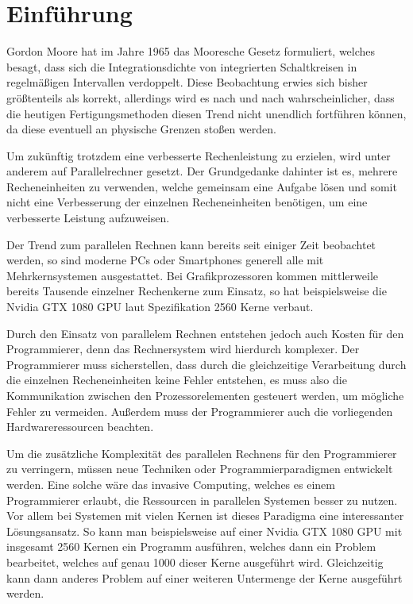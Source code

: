 \chapter{Einführung}\label{sec:intro}

Gordon Moore hat im Jahre 1965 das Mooresche Gesetz formuliert, welches besagt, dass sich die Integrationsdichte
von integrierten Schaltkreisen in regelmäßigen Intervallen verdoppelt\cite{mooresLawPastPresentFuture}.
Diese Beobachtung erwies sich bisher größtenteils als korrekt, allerdings wird es nach und nach wahrscheinlicher,
dass die heutigen Fertigungsmethoden diesen Trend nicht unendlich fortführen können, da diese eventuell an
physische Grenzen stoßen werden.

Um zukünftig trotzdem eine verbesserte Rechenleistung zu erzielen, wird unter anderem auf Parallelrechner gesetzt.
Der Grundgedanke dahinter ist es, mehrere Recheneinheiten zu verwenden, welche gemeinsam eine Aufgabe
lösen und somit nicht eine Verbesserung der einzelnen Recheneinheiten benötigen, um eine verbesserte Leistung
aufzuweisen.

Der Trend zum parallelen Rechnen kann bereits seit einiger Zeit beobachtet werden,
so sind moderne PCs oder Smartphones generell alle mit Mehrkernsystemen ausgestattet.
Bei Grafikprozessoren kommen mittlerweile bereits Tausende einzelner Rechenkerne zum Einsatz,
so hat beispielsweise die Nvidia GTX 1080 GPU laut Spezifikation \cite{nvidia1080specs} 2560 Kerne verbaut.

Durch den Einsatz von parallelem Rechnen entstehen jedoch auch Kosten für den Programmierer,
denn das Rechnersystem wird hierdurch komplexer.
Der Programmierer muss sicherstellen, dass durch die gleichzeitige Verarbeitung durch die einzelnen
Recheneinheiten keine Fehler entstehen, es muss also die Kommunikation zwischen den Prozessorelementen gesteuert 
werden, um mögliche Fehler zu vermeiden.
Außerdem muss der Programmierer auch die vorliegenden Hardwareressourcen beachten.

Um die zusätzliche Komplexität des parallelen Rechnens für den Programmierer zu verringern,
müssen neue Techniken oder Programmierparadigmen entwickelt werden.
Eine solche wäre das invasive Computing, welches es einem Programmierer erlaubt,
die Ressourcen in parallelen Systemen besser zu nutzen.
Vor allem bei Systemen mit vielen Kernen ist dieses Paradigma eine interessanter Lösungsansatz.
So kann man beispielsweise auf einer Nvidia GTX 1080 GPU mit insgesamt 2560 Kernen ein Programm
ausführen, welches dann ein Problem bearbeitet, welches auf genau 1000 dieser Kerne ausgeführt wird.
Gleichzeitig kann dann anderes Problem auf einer weiteren Untermenge der Kerne ausgeführt werden.


